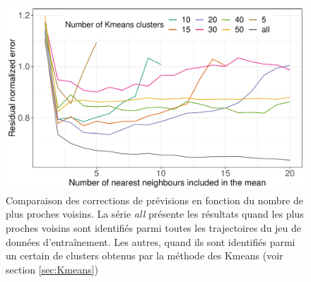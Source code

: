 \documentclass[12pt]{report}
\begin{document}
\begin{figure}[htbp]
	\centering
	\includegraphics[width=0.75\linewidth]{Images/PV/KNN/KNN_compare.pdf}
	\caption{Comparaison des corrections de prévisions en fonction du nombre de plus proches voisins. La série \textit{all} présente les résultats quand les plus proches voisins sont identifiés parmi toutes les trajectoires du jeu de données d'entraînement. Les autres, quand ils sont identifiés parmi un certain de clusters obtenus par la méthode des Kmeans (voir section \ref{sec:Kmeans})}
	\label{fig:KNN_Comp}
\end{figure}
\end{document}
